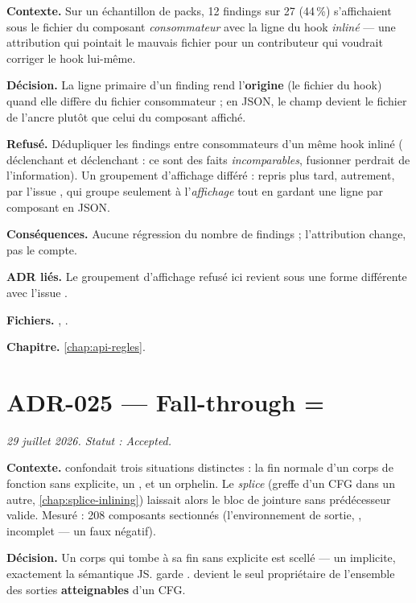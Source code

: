 \textbf{Contexte.} Sur un échantillon de packs, 12 findings sur 27 (44\,\%)
s'affichaient sous le fichier du composant \emph{consommateur} avec la ligne
du hook \emph{inliné} --- une attribution qui pointait le mauvais fichier pour
un contributeur qui voudrait corriger le hook lui-même.

\textbf{Décision.} La ligne primaire d'un finding rend l'\textbf{origine}
(le fichier du hook) quand elle diffère du fichier consommateur ; en JSON, le
champ  devient le fichier de l'ancre plutôt que celui du composant
affiché.

\textbf{Refusé.} Dédupliquer les findings entre consommateurs d'un même hook
inliné ( déclenchant  et
 déclenchant  : ce sont des faits
\emph{incomparables}, fusionner perdrait de l'information). Un groupement
d'affichage différé : repris plus tard, autrement, par l'issue ,
qui groupe seulement à l'\emph{affichage} tout en gardant une ligne par
composant en JSON.

\textbf{Conséquences.} Aucune régression du nombre de findings ; l'attribution
change, pas le compte.

\textbf{ADR liés.} Le groupement d'affichage refusé ici revient sous une
forme différente avec l'issue .

\textbf{Fichiers.} , .

\textbf{Chapitre.} \cref{chap:api-regles}.

\section{ADR-025 --- Fall-through = }
\label{adr:25}
\noindent\textit{29 juillet 2026. Statut : Accepted.}

\textbf{Contexte.}  confondait trois situations
distinctes : la fin normale d'un corps de fonction sans 
explicite, un , et un  orphelin. Le \emph{splice}
(greffe d'un CFG dans un autre, \cref{chap:splice-inlining}) laissait alors le
bloc de jointure sans prédécesseur valide. Mesuré : 208 composants
\og sectionnés\fg{} (l'environnement de sortie, , incomplet ---
un faux négatif).

\textbf{Décision.} Un corps qui \og tombe\fg{} à sa fin sans 
explicite est scellé  --- un 
implicite, exactement la sémantique JS.  garde
.  devient le seul propriétaire de
l'ensemble des sorties \textbf{atteignables} d'un CFG.

